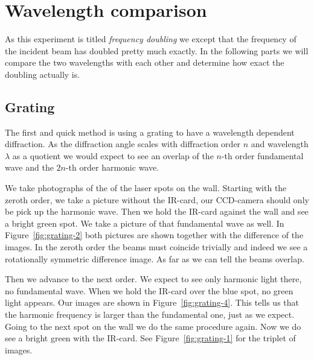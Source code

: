 \documentclass[11pt, english, fleqn, DIV=15, headinclude, BCOR=2cm]{scrreprt}
\begin{document}

\section{Wavelength comparison}

As this experiment is titled \emph{frequency doubling} we except that the
frequency of the incident beam has doubled pretty much exactly. In the
following parts we will compare the two wavelengths with each other and
determine how exact the doubling actually is.

\subsection{Grating}

The first and quick method is using a grating to have a wavelength dependent
diffraction. As the diffraction angle scales with diffraction order $n$ and
wavelength $\lambda$ as a quotient we would expect to see an overlap of the
$n$-th order fundamental wave and the $2n$-th order harmonic wave.

We take photographs of the of the laser spots on the wall. Starting with the
zeroth order, we take a picture without the IR-card, our CCD-camera should only
be pick up the harmonic wave. Then we hold the IR-card against the wall and see
a bright green spot. We take a picture of that fundamental wave as well. In
Figure~\ref{fig:grating-2} both pictures are shown together with the difference
of the images. In the zeroth order the beams must coincide trivially and indeed
we see a rotationally symmetric difference image. As far as we can tell the
beams overlap.

Then we advance to the next order. We expect to see only harmonic light there,
no fundamental wave. When we hold the IR-card over the blue spot, no green
light appears. Our images are shown in Figure~\ref{fig:grating-4}. This tells
us that the harmonic frequency is larger than the fundamental one, just as we
expect. Going to the next spot on the wall we do the same procedure again. Now
we do see a bright green with the IR-card. See Figure~\ref{fig:grating-1} for
the triplet of images.
\end{document}
